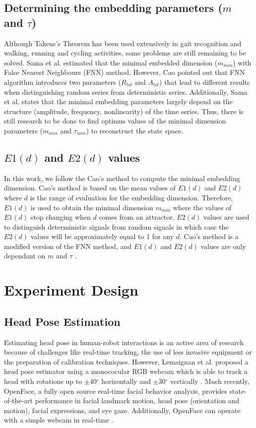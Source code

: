 \documentclass{sigchi}
\begin{document}
\subsection{Determining the embedding parameters ($m$ and $\tau$)}
Although Takens's Theorem has been used extensively in gait
recognition and walking, running and cycling activities,
some problems are still remaining to be solved.
Sama et al. \cite{Sama2013} estimated that the minimal embedded
dimension ($m_{min}$) with False Nearest Neighbours (FNN) method.
However, Cao \cite{Cao1997} pointed out that FNN algorithm
introduces two parameters ($R_{tol}$ and $A_{tol}$) that lead
to different results when distinguishing random series from deterministic series.
Additionally, Sama et al. \cite{Sama2013} states that the minimal embedding
parameters largely depend on the structure (amplitude, frequency, nonlinearity)
of the time series. Thus, there is still research to be done to find
optimus values of the minimal dimension parameters ($m_{min}$ and $\tau_{min}$)
to reconstruct the state space.

\subsection{$E1(d)$ and $E2(d)$ values}
In this work, we follow the Cao's method \cite{Cao1997} to compute the minimal
embedding dimension. Cao's method is based on the mean values of $E1(d)$ and $E2(d)$
where $d$ is the range of evaluation for the embedding dimension.
Therefore, $E1(d)$ is used to obtain the minimal dimension $m_{min}$
where the values of $E1(d)$ stop changing when $d$ comes from an attractor.
$E2(d)$ values are used to distinguish deterministic signals from random signals
in which case the $E2(d)$ values will be approximately equal to 1 for any $d$.
Cao's method is a modified version of the FNN method, and $E1(d)$ and $E2(d)$
values are only dependant on $m$ and $\tau$ .


\section{Experiment Design}

\subsection{Head Pose Estimation}

Estimating head pose in human-robot interactions is an active area of research
because of challenges like real-time tracking, the use of less invasive equipment
or the preparation of calibration techniques. However, Lemaignan et al. proposed a head pose estimator
using a monococular RGB webcam which is able to track a head with rotations up
to $\pm$40$^{\circ}$ horizontally and $\pm$30$^{\circ}$ vertically \cite{Lemaignan2016}.
Much recently, OpenFace, a fully open source real-time facial behavior analysis,
provides state-of-the-art performance in facial landmark motion,
head pose (orientation and motion), facial expressions, and eye gaze.
Additionally, OpenFace can operate with a simple webcam in real-time
\cite{Baltrusaitis2016}.
\end{document}
